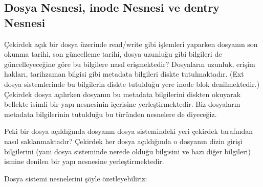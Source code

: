 \documentclass[a4paper,10pt,turkish]{sphinxmanual}
\begin{document}
\subsection{Dosya Nesnesi, inode Nesnesi ve dentry Nesnesi}
\label{\detokenize{filesystem1:dosya-nesnesi-inode-nesnesi-ve-dentry-nesnesi}}
\sphinxAtStartPar
Çekirdek açık bir dosya üzerinde read/write gibi işlemleri yaparken dosyanın son okunma tarihi,
son güncelleme tarihi, dosya uzunluğu gibi bilgileri de güncelleyeceğine göre bu bilgilere nasıl
erişmektedir? Dosyaların uzunluk, erişim hakları, tarih\sphinxhyphen{}zaman bilgisi gibi metadata bilgileri
diskte tutulmaktadır. (Ext dosya sistemlerinde bu bilgilerin diskte tutulduğu yere inode blok
denilmektedir.) Çekirdek dosya açılırken dosyanın bu metadata bilgilerini diskten okuyarak
bellekte  isimli bir yapı nesnesinin içerisine yerleştirmektedir. Biz dosyaların
metadata bilgilerinin tutulduğu bu  türünden nesnelere  de
diyeceğiz.

\sphinxAtStartPar
Peki bir dosya açıldığında dosyanın dosya sistemindeki yeri çekirdek tarafından nasıl
saklanmaktadır? Çekirdek her dosya açıldığında o dosyanın dizin girişi bilgilerini (yani dosya
sisteminde nerede olduğu bilgisini ve bazı diğer bilgileri) ismine  denilen bir yapı
nesnesine yerleştirmektedir.

\sphinxAtStartPar
Dosya sistemi nesnelerini şöyle özetleyebiliriz:
\end{document}
